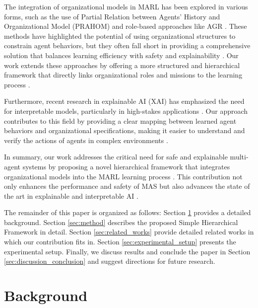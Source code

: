 \documentclass[sigconf,anonymous]{aamas}
\begin{document}
The integration of organizational models in MARL has been explored in various forms, such as the use of Partial Relation between Agents' History and Organizational Model (PRAHOM) \cite{soule2024} and role-based approaches like AGR \cite{agr_reference}. These methods have highlighted the potential of using organizational structures to constrain agent behaviors, but they often fall short in providing a comprehensive solution that balances learning efficiency with safety and explainability \cite{hernandez2019survey, ghosal2021explainable}. Our work extends these approaches by offering a more structured and hierarchical framework that directly links organizational roles and missions to the learning process \cite{hubner2010moise, yang2018mean}.

Furthermore, recent research in explainable AI (XAI) \cite{xai_reference} has emphasized the need for interpretable models, particularly in high-stakes applications \cite{ghosal2021explainable, bastani2018verifiable}. Our approach contributes to this field by providing a clear mapping between learned agent behaviors and organizational specifications, making it easier to understand and verify the actions of agents in complex environments \cite{su2021toward, castaneda2019policy}.

In summary, our work addresses the critical need for safe and explainable multi-agent systems by proposing a novel hierarchical framework that integrates organizational models into the MARL learning process \cite{hubner2010moise, de2020survey}. This contribution not only enhances the performance and safety of MAS but also advances the state of the art in explainable and interpretable AI \cite{bastani2018verifiable, wei2019safe}.

The remainder of this paper is organized as follows: Section \ref{sec:background} provides a detailed background. Section \ref{sec:method} describes the proposed Simple Hierarchical Framework in detail. Section \ref{sec:related_works} provide detailed related works in which our contribution fits in. Section \ref{sec:experimental_setup} presents the experimental setup. Finally, we discuss results and conclude the paper in Section \ref{sec:discussion_conclusion} and suggest directions for future research.


\section{Background}
\label{sec:background}
\end{document}
